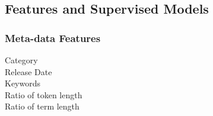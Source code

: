 \subsection{Features and Supervised Models}
\label{sec:4.3}
\subsubsection{Meta-data Features}
\begin{description}
\item[Category] 
\item[Release Date] 
\item[Keywords] 
\item[Ratio of token length] 
\item[Ratio of term length] 
\end{description}
